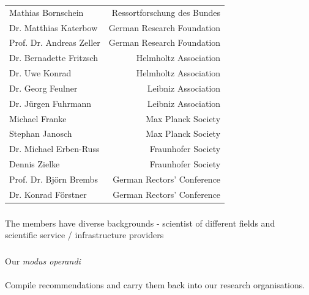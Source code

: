 \documentclass{beamer}
\begin{document}
\begin{frame}
  \frametitle{}
    \begin{block}{}  
      \begin{center}
        {\large
      \begin{tabular}{lr}
        Mathias Bornschein & Ressortforschung des Bundes\\
        Dr. Matthias Katerbow & German Research Foundation \\
        Prof. Dr. Andreas Zeller & German Research Foundation\\
        Dr. Bernadette Fritzsch & Helmholtz Association \\
        Dr. Uwe Konrad & Helmholtz Association\\
        Dr. Georg Feulner & Leibniz Association\\
        Dr. Jürgen Fuhrmann & Leibniz Association\\
        Michael Franke & Max Planck Society \\
        Stephan Janosch & Max Planck Society \\
        Dr. Michael Erben-Russ & Fraunhofer Society \\
        Dennis Zielke & Fraunhofer Society \\        
        Prof. Dr. Björn Brembs & German Rectors' Conference\\
        Dr. Konrad Förstner & German Rectors' Conference\\
      \end{tabular}}
    \end{center}
    \end{block}
\end{frame}

\begin{frame}
  \frametitle{}
  \begin{block}{}
    \begin{center}
      The members have diverse backgrounds - scientist of different
      fields and\\scientific service / infrastructure providers
    \end{center}
  \end{block}
\end{frame}

\begin{frame}
  \frametitle{}
  \begin{block}{}
    \begin{center}
      Our \textit{modus operandi}\\\ \\
      Compile recommendations and carry them back into our research
      organisations.
    \end{center}
  \end{block}
\end{frame}
\end{document}
